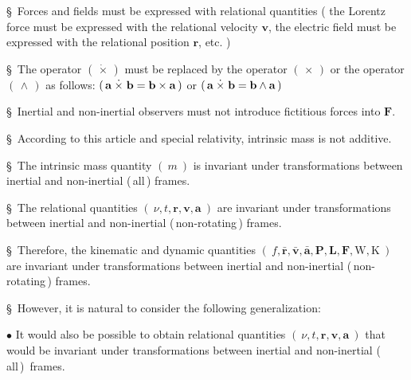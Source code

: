 \documentclass[10pt,fleqn]{article}
\begin{document}
\noindent \S \ Forces and fields must be expressed with relational quantities ( the Lorentz force must be expressed with the relational velocity {\small $\mathbf{v}$}, the electric field must be expressed with the relational position {\small $\mathbf{r}$}, etc. )
\par \medskip \smallskip
\noindent \S \ The operator {\small $( \, \dot{\times} \, )$} must be replaced by the operator {\small $( \, \times \, )$} or the operator {\small $( \, \wedge \, )$} as follows: {\small $( \, \mathbf{a} \hspace{+0.24em}\dot{\times}\hspace{+0.30em} \mathbf{b} = \mathbf{b} \times \mathbf{a} \, )$} or {\small $( \, \mathbf{a} \hspace{+0.24em}\dot{\times}\hspace{+0.30em} \mathbf{b} = \mathbf{b} \wedge \mathbf{a} \, )$}
\par \medskip \smallskip
\noindent \S \ Inertial and non-inertial observers must not introduce fictitious forces into ${\mathbf{F}}$.
\par \medskip \smallskip
\noindent \S \ According to this article and special relativity, intrinsic mass is not additive.
\par \medskip \smallskip
\noindent \S \ The intrinsic mass quantity {\small $( \: m \: )$} is invariant under transformations between inertial and non-inertial (\,all\,) frames.
\par \medskip \smallskip
\noindent \S \ The relational quantities {\small $( \: \nu, t, \mathbf{r}, \mathbf{v}, \mathbf{a} \: )$} are invariant under transformations between inertial and non-inertial (\,non-rotating\,) frames.
\par \medskip \smallskip
\noindent \S \ Therefore, the kinematic and dynamic quantities {\small $( \: f, \bar{\mathbf{r}}, \bar{\mathbf{v}}, \bar{\mathbf{a}}, \mathbf{P}, \mathbf{L}, \mathbf{F}, \mathrm{W}, \mathrm{K} \: )$} are invariant under transformations between inertial and non-inertial (\,non-rotating\,) frames.
\par \medskip \smallskip
\noindent \S \ However, it is natural to consider the following generalization:
\par \medskip \smallskip
\noindent $\bullet$ It would also be possible to obtain relational quantities {\small $( \: \nu, t, \mathbf{r}, \mathbf{v}, \mathbf{a} \: )$} that would be invariant under transformations between inertial and non\hspace{+0.03em}-\hspace{+0.03em}inertial \hbox{(\,all\,) frames}.
\end{document}
